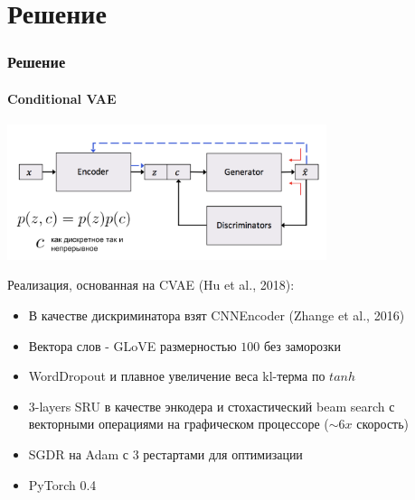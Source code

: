 \documentclass[10pt]{beamer}
\begin{document}
\section{Решение}
\begin{frame}
\frametitle{Решение}
\framesubtitle{Conditional VAE}


\begin{center}
    \includegraphics[width=0.7\textwidth]{images/cvae.png}
\end{center}

Реализация, основанная на CVAE (Hu et al., 2018):
\begin{itemize}
    \item В качестве дискриминатора взят CNNEncoder (Zhange et al., 2016)
    \item Вектора слов - GLoVE размерностью $100$ без заморозки
    \item WordDropout и плавное увеличение веса kl-терма по $tanh$
    \item 3-layers SRU в качестве энкодера и стохастический beam search с векторными операциями на графическом процессоре ($\sim 6x$ скорость)
    \item SGDR на Adam с $3$ рестартами для оптимизации
    \item PyTorch 0.4
\end{itemize}


\end{frame}
\end{document}
